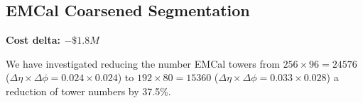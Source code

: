 \subsection{EMCal Coarsened Segmentation}
\label{emcal_segmentation}

\textbf{Cost delta: $-\$1.8M$}

We have investigated reducing the number EMCal towers from
$256\times96=24576$ ($\Delta\eta\times\Delta\phi = 0.024 \times 0.024$) to
$192\times80 = 15360$ ($\Delta\eta\times\Delta\phi = 0.033 \times 0.028$) a
reduction of tower numbers by 37.5\%.  
